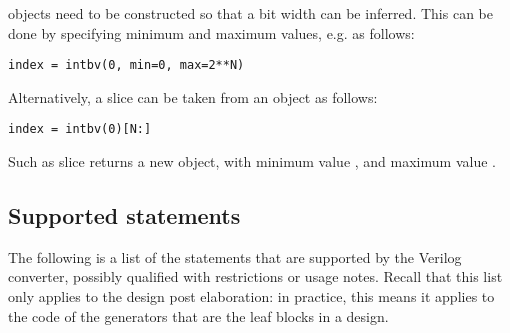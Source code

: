  objects need to be constructed so that a bit
width can be inferred. This can be done by specifying minimum
and maximum values, e.g. as follows:

\begin{verbatim}
index = intbv(0, min=0, max=2**N)
\end{verbatim}

Alternatively, a slice can be taken from an  object
as follows:

\begin{verbatim}
index = intbv(0)[N:]
\end{verbatim}

Such as slice returns a new  object, with minimum
value  , and maximum value .


\subsection{Supported statements\label{conv-subset-statements}}

The following is a list of the statements that are supported by the
Verilog converter, possibly qualified with restrictions
or usage notes. Recall that
this list only applies to the design post elaboration: in practice,
this means it applies to the code of the generators that are the leaf
blocks in a design.

